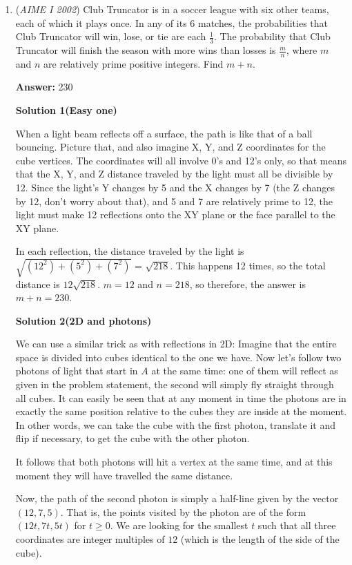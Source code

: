 \begin{enumerate}
 


	\item (\textit{AIME I 2002}) Club Truncator is in a soccer league with six other teams, each of which it plays once. In any of its 6 matches, the probabilities that Club Truncator will win, lose, or tie are each $\frac {1}{3}$. The probability that Club Truncator will finish the season with more wins than losses is $\frac {m}{n}$, where $m$ and $n$ are relatively prime positive integers. Find $m + n$.


 
 \textbf{Answer: }230



\textbf{Solution 1(Easy one)}

When a light beam reflects off a surface, the path is like that of a ball bouncing. Picture that, and also imagine X, Y, and Z coordinates for the cube vertices. The coordinates will all involve 0's and 12's only, so that means that the X, Y, and Z distance traveled by the light must all be divisible by 12. Since the light's Y changes by 5 and the X changes by 7 (the Z changes by 12, don't worry about that), and 5 and 7 are relatively prime to 12, the light must make 12 reflections onto the XY plane or the face parallel to the XY plane. 

 In each reflection, the distance traveled by the light is $\sqrt{ (12^2) + (5^2) + (7^2) }$ = $\sqrt{218}$. This happens 12 times, so the total distance is $12\sqrt{218}$. $m=12$ and $n=218$, so therefore, the answer is $m+n=\boxed{230}$.

 



\textbf{Solution 2(2D and photons)}

We can use a similar trick as with reflections in 2D: Imagine that the entire space is divided into cubes identical to the one we have. Now let's follow two photons of light that start in $A$ at the same time: one of them will reflect as given in the problem statement, the second will simply fly straight through all cubes. It can easily be seen that at any moment in time the photons are in exactly the same position relative to the cubes they are inside at the moment. In other words, we can take the cube with the first photon, translate it and flip if necessary, to get the cube with the other photon.

 It follows that both photons will hit a vertex at the same time, and at this moment they will have travelled the same distance. 

 Now, the path of the second photon is simply a half-line given by the vector $(12,7,5)$. That is, the points visited by the photon are of the form $(12t,7t,5t)$ for $t\geq 0$. We are looking for the smallest $t$ such that all three coordinates are integer multiples of $12$ (which is the length of the side of the cube).


\end{enumerate}

